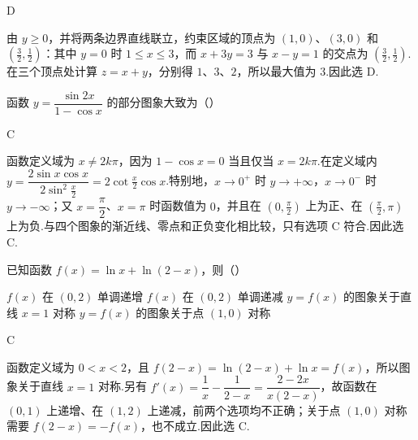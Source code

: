 \begin{answer}
D
\end{answer}

\begin{solution}
由 \(y\ge0\)，并将两条边界直线联立，约束区域的顶点为 \((1,0)\)、\((3,0)\) 和 \(\left(\frac32,\frac12\right)\)：其中 \(y=0\) 时 \(1\le x\le3\)，而 \(x+3y=3\) 与 \(x-y=1\) 的交点为 \(\left(\frac32,\frac12\right)\).在三个顶点处计算 \(z=x+y\)，分别得 \(1\)、\(3\)、\(2\)，所以最大值为 \(3\).因此选 D.
\end{solution}

\begin{problem}
函数 \(y=\dfrac{\sin 2x}{1-\cos x}\) 的部分图象大致为（\quad）

    {}
    {}
    {}
\end{problem}

\begin{answer}
C
\end{answer}

\begin{solution}
函数定义域为 \(x\ne2k\pi\)，因为 \(1-\cos x=0\) 当且仅当 \(x=2k\pi\).在定义域内 \(y=\dfrac{2\sin x\cos x}{2\sin^2\frac{x}{2}}=2\cot\frac{x}{2}\cos x\).特别地，\(x\to0^+\) 时 \(y\to+\infty\)，\(x\to0^-\) 时 \(y\to-\infty\)；又 \(x=\dfrac\pi2\)、\(x=\pi\) 时函数值为 \(0\)，并且在 \((0,\frac\pi2)\) 上为正、在 \((\frac\pi2,\pi)\) 上为负.与四个图象的渐近线、零点和正负变化相比较，只有选项 C 符合.因此选 C.
\end{solution}

\begin{problem}
已知函数 \(f(x)=\ln x+\ln(2-x)\)，则（\quad）

\choices
    {\(f(x)\) 在 \((0,2)\) 单调递增}
    {\(f(x)\) 在 \((0,2)\) 单调递减}
    {\(y=f(x)\) 的图象关于直线 \(x=1\) 对称}
    {\(y=f(x)\) 的图象关于点 \((1,0)\) 对称}
\end{problem}

\begin{answer}
C
\end{answer}

\begin{solution}
函数定义域为 \(0<x<2\)，且 \(f(2-x)=\ln(2-x)+\ln x=f(x)\)，所以图象关于直线 \(x=1\) 对称.另有 \(f'(x)=\dfrac1x-\dfrac1{2-x}=\dfrac{2-2x}{x(2-x)}\)，故函数在 \((0,1)\) 上递增、在 \((1,2)\) 上递减，前两个选项均不正确；关于点 \((1,0)\) 对称需要 \(f(2-x)=-f(x)\)，也不成立.因此选 C.
\end{solution}

